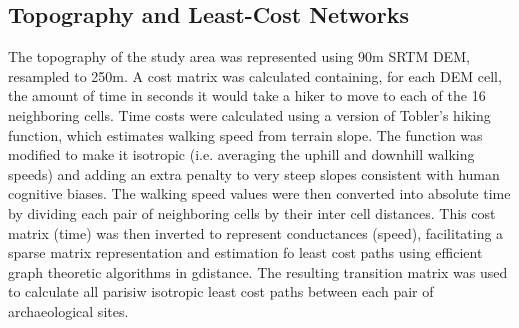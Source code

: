 \documentclass[11pt]{wlscirep}
\begin{document}
\subsection*{Topography and Least-Cost Networks}
The topography of the study area was represented using 90m SRTM DEM, resampled to 250m. A cost matrix was calculated containing, for each DEM cell, the amount of time in seconds it would take a hiker to move to each of the 16 neighboring cells. Time costs were calculated using a version of Tobler's hiking function, which estimates walking speed from terrain slope. The function was modified to make it isotropic (i.e. averaging the uphill and downhill walking speeds) and adding an extra penalty to very steep slopes consistent with human cognitive biases. The walking speed values were then converted into absolute time by dividing each pair of neighboring cells by their inter cell distances. This cost matrix (time) was then inverted to represent conductances (speed), facilitating a sparse matrix representation and estimation fo least cost paths using efficient graph theoretic algorithms in gdistance. The resulting transition matrix was used to calculate all parisiw isotropic least cost paths between each pair of archaeological sites.

\end{document}
